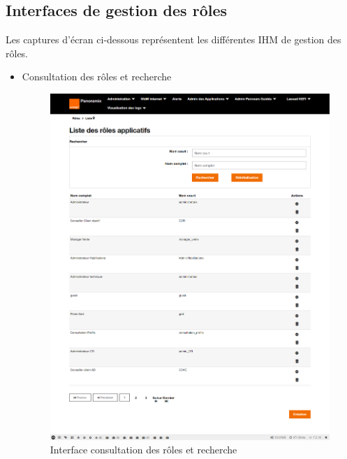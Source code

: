 \subsection{Interfaces de gestion des rôles}
Les captures d'écran ci-dessous représentent les différentes IHM de gestion des rôles.
\begin{itemize}
	\item Consultation des rôles et recherche
	\begin{figure}[H]
		\centering
		\includegraphics[width=0.65\linewidth]{img/screenshots/roles/index}
		\caption[Interface consultation des rôles]{Interface consultation des rôles et recherche}
		\label{fig:index-roles}
	\end{figure}
	

\end{itemize}
